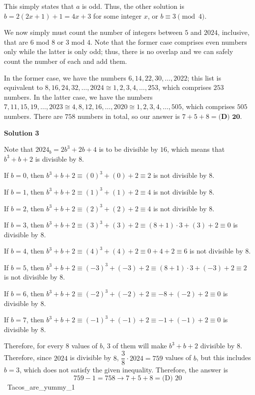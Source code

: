 \begin{enumerate}
 This simply states that $a$ is odd. Thus, the other solution is $b=2(2x+1)+1=4x+3$ for some integer $x$, or $b\equiv3\pmod4$. 

 We now simply must count the number of integers between $5$ and $2024$, inclusive, that are $6$ mod $8$ or $3$ mod $4$. Note that the former case comprises even numbers only while the latter is only odd; thus, there is no overlap and we can safely count the number of each and add them. 

 In the former case, we have the numbers $6,14,22,30,\dots,2022$; this list is equivalent to $8,16,24,32,\dots,2024\cong1,2,3,4,\dots,253$, which comprises $253$ numbers. In the latter case, we have the numbers $7,11,15,19,\dots,2023\cong4,8,12,16,\dots,2020\cong1,2,3,4,\dots,505$, which comprises $505$ numbers. There are $758$ numbers in total, so our answer is $7+5+8=\boxed{\textbf{(D) 20}}$. 

 



\textbf{Solution 3}

Note that $2024_b=2b^3+2b+4$ is to be divisible by $16$, which means that $b^3+b+2$ is divisible by $8$.

 If $b=0$, then $b^3+b+2 \equiv (0)^3 + (0) + 2 \equiv 2$ is not divisible by $8$.

 If $b=1$, then $b^3+b+2 \equiv (1)^3 + (1) + 2  \equiv 4$ is not divisible by $8$.

 If $b=2$, then $b^3+b+2 \equiv (2)^3 + (2) + 2  \equiv 4$ is not divisible by $8$.

 If $b=3$, then $b^3+b+2 \equiv (3)^3 + (3) + 2  \equiv (8+1)\cdot3 + (3) + 2 \equiv 0$ is divisible by $8$.

 If $b=4$, then $b^3+b+2 \equiv (4)^3 + (4) + 2 \equiv 0 + 4 + 2 \equiv 6$ is not divisible by $8$.

 If $b=5$, then $b^3+b+2 \equiv (-3)^3 + (-3) + 2 \equiv  (8+1)\cdot 3 + (-3) + 2 \equiv 2$ is not divisible by $8$.

 If $b=6$, then $b^3+b+2 \equiv (-2)^3 + (-2) + 2 \equiv -8 + (-2) + 2 \equiv 0$ is divisible by $8$.

 If $b=7$, then $b^3+b+2 \equiv (-1)^3 + (-1) + 2 \equiv -1 + (-1) + 2 \equiv 0$ is divisible by $8$.

 Therefore, for every $8$ values of $b$, $3$ of them will make $b^3+b+2$ divisible by $8$. Therefore, since $2024$ is divisible by $8$, $\dfrac{3}{8}\cdot2024=759$ values of $b$, but this includes $b=3$, which does not satisfy the given inequality. Therefore, the answer is 
 \[759-1=758\rightarrow7+5+8=\boxed{\text{(D) }20}\] ~Tacos\_are\_yummy\_1


\end{enumerate}
